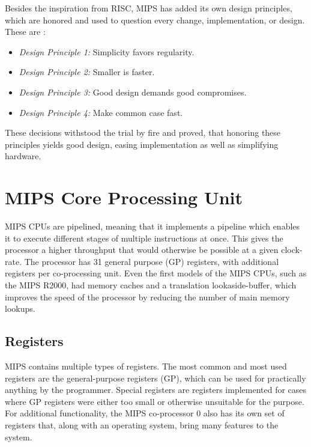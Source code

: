 Besides the inspiration from RISC, MIPS has added its own design principles,
which are honored and used to question every change, implementation,
or design.
These are \cite{COD5}:
\begin{itemize}
	\item \textit{Design Principle 1:} Simplicity favors regularity.
	\item \textit{Design Principle 2:} Smaller is faster.
	\item \textit{Design Principle 3:} Good design demands good
	compromises.
	\item \textit{Design Principle 4:} Make common case fast.
\end{itemize}
These decisions withstood the trial by fire and proved, that honoring these
principles yields good design, easing implementation as well as simplifying
hardware.


\section{MIPS Core Processing Unit}
MIPS CPUs are pipelined, meaning that it implements a pipeline which
enables it
to execute different stages of multiple instructions at once. This gives the
processor a higher throughput that would otherwise be possible at a given
clock-rate. The processor has 31 general purpose (GP) registers, with
additional registers
per co-processing unit. Even the first models of the MIPS CPUs, such as the
MIPS R2000, had memory caches and a translation lookaside-buffer, which improves
the speed of the processor by reducing the number of main memory lookups.

\subsection{Registers}
MIPS contains multiple types of registers. The most common and most used
registers are the general-purpose registers (GP), which can be used for
practically anything by the programmer. Special registers are registers
implemented for cases where GP registers were either too small or otherwise
unsuitable for the purpose.\\
For additional functionality, the MIPS co-processor 0 also has its own set of
registers that, along with an operating system, bring many features to the
system.


